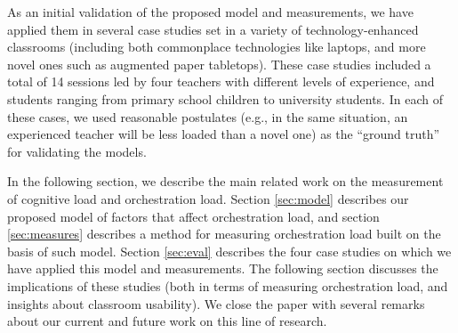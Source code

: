\documentclass[10pt,journal,compsoc]{IEEEtran}
\begin{document}
As an initial validation of the proposed model and measurements, we have applied them in several case studies set in a variety of technology-enhanced classrooms (including both commonplace technologies like laptops, and more novel ones such as augmented paper tabletops). These case studies included a total of 14 sessions led by four teachers with different levels of experience, and students ranging from primary school children to university students. In each of these cases, we used reasonable postulates (e.g., in the same situation, an experienced teacher will be less loaded than a novel one) as the ``ground truth'' for validating the models.

In the following section, we describe the main related work on the measurement of cognitive load and orchestration load. Section \ref{sec:model} describes our proposed model of factors that affect orchestration load, and section \ref{sec:measures} describes a method for measuring orchestration load built on the basis of such model. Section \ref{sec:eval} describes the four case studies on which we have applied this model and measurements. The following section discusses the implications of these studies (both in terms of measuring orchestration load, and insights about classroom usability). We close the paper with several remarks about our current and future work on this line of research.
\end{document}
